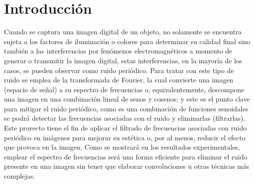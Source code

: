 \section{Introducción}
    Cuando se captura una imagen digital de un objeto, no solamente se encuentra 
    sujeta a los factores de iluminación o colores para determinar su calidad 
    final sino también a las interferencias por fenómenos electromagnéticos a 
    momento de generar o transmitir la imagen digital, estas interferencias, 
    en la mayoría de los casos, se pueden observar como ruido periódico. Para
    tratar con este tipo de ruido se emplea de la transformada de Fourier, la 
    cual convierte una imagen (espacio de señal) a su espectro de frecuencias 
    o, equivalentemente, descompone una imagen en una combinación lineal de 
    senos y cosenos; y este es el punto clave para mitigar el ruido periódico, 
    como es una combinación de funciones senoidales se podrá detectar las 
    frecuencias asociadas con el ruido y eliminarlas (filtrarlas).\\

    Este proyecto tiene el fin de aplicar el filtrado de frecuencias asociadas 
    con ruido periódico en imágenes para mejorar su estética o, por al menos, 
    reducir el efecto que provoca en la imagen. Como se mostrará en los 
    resultados experimentales, emplear el espectro de frecuencias será una 
    forma eficiente para eliminar el ruido presente en una imagen sin tener 
    que elaborar convoluciones u otras técnicas más complejas.